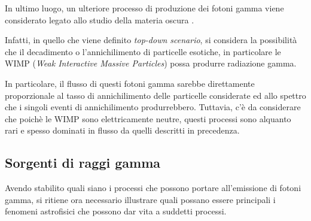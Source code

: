\documentclass[10pt]{article}
\begin{document}
In ultimo luogo, un ulteriore processo di produzione dei fotoni gamma viene considerato legato allo studio della materia oscura \cite{GRA2018}.

Infatti, in quello che viene definito \textit{top-down scenario}, si considera la possibilità che il decadimento o l'annichilimento di particelle esotiche, in particolare le WIMP (\textit{Weak Interactive Massive Particles}) possa produrre radiazione gamma.

In particolare, il flusso di questi fotoni gamma sarebbe direttamente proporzionale al tasso di annichilimento delle particelle considerate ed allo spettro che i singoli eventi di annichilimento produrrebbero.
Tuttavia, c'è da considerare che poichè le WIMP sono elettricamente neutre, questi processi sono alquanto rari e spesso dominati in flusso da quelli descritti in precedenza.

\subsection{Sorgenti di raggi gamma}
Avendo stabilito quali siano i processi che possono portare all'emissione di fotoni gamma, si ritiene ora necessario illustrare quali possano essere principali i fenomeni astrofisici che possono dar vita a suddetti processi.
\\
\end{document}
